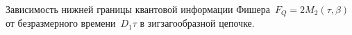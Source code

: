 Зависимость нижней границы квантовой информации Фишера~$F_Q=2M_2(\tau, \beta)$
от безразмерного времени~$D_1\tau$
в зигзагообразной цепочке.
